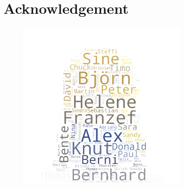 \chapter*{Acknowledgement}
\label{sec:acknowledgement}
\vspace*{-10mm}

\begin{figure}[h]
	\centering
	\includegraphics[width=0.75\textwidth]{util/ack.png}
\end{figure}

